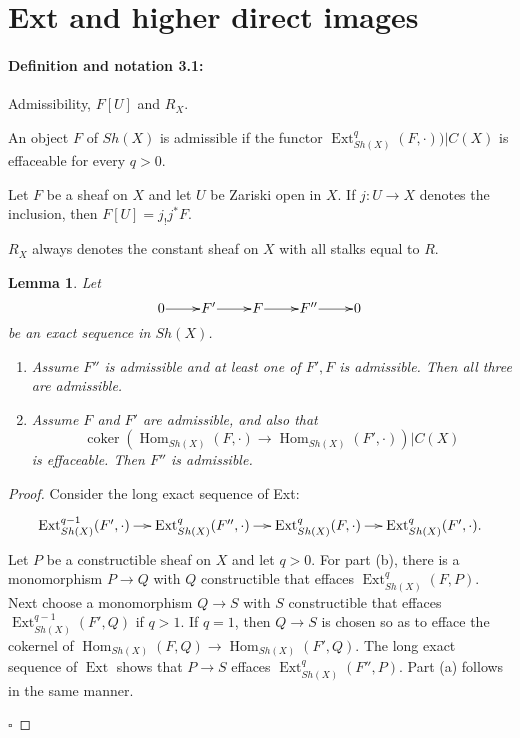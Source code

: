 \documentclass[10pt,twoside]{article}
\newtheorem{lem}[thm]{Lemma}
\newcommand{\Hom}{{\operatorname{Hom}}}
\newcommand{\Ext}{{\operatorname{Ext}}}
\newcommand{\coker}{\operatorname{coker}}
\newcommand{\qed}{\nopagebreak\par\hspace*{\fill}$\square$\par\vskip2mm}
\newtheorem{proof}{Proof}
\begin{document}
\section{Ext and higher direct images}

\paragraph{\textbf{Definition and notation 3.1:}}Admissibility, 
$F[U]$ and $R_X$.

An object $F$ of $Sh(X)$ is admissible if the functor $\Ext^q_{Sh(X)}(F,\cdot))
|C(X)$ is effaceable for every $q>0$.

Let $F$ be a sheaf on $X$ and let $U$ be Zariski open in $X$.
If $j:U \to X$ denotes the inclusion, then $F[U]=j_!j^*F$. 
 
$R_X$ always denotes the constant sheaf on $X$ with all stalks 
equal to $R$. 


\renewcommand{\thethm}{3.2}

\begin{lem} Let 
$$
\xymatrix@1{
0\ar[r] & F'\ar[r] & F \ar[r] & F'' \ar[r] & 0
}
$$ 
be an exact sequence in $Sh(X)$. 
\begin{enumerate}
\item[{\rm (a)}] Assume $F''$ is admissible
and at least one of  {$F', F$} is admissible. Then all three are
admissible. 
\item[{\rm (b)}] Assume $F$ and $F'$ are admissible, and also 
that  
$$
\coker ( \Hom_{Sh(X)}(F,\cdot) \to \Hom_{Sh(X)}(F',\cdot))|C(X) 
$$ 
is effaceable. Then  $F''$ is admissible.
\end{enumerate}
\end{lem}

\begin{proof} Consider the long exact sequence of Ext:
$$
\xymatrix@-1pc{
\Ext^{q-1}_{Sh(X)}(F',\cdot) \ar[r] &
\Ext^q_{Sh(X)}(F'',\cdot) \ar[r] &  \Ext^q_{Sh(X)}(F,\cdot)    
\ar[r] & \Ext^q_{Sh(X)}(F',\cdot). 
}
$$
Let $P$ be a constructible sheaf on $X$ and let $q>0$. For
part (b), there is a monomorphism $P \to Q$ with $Q$ constructible
that effaces $\Ext^q_{Sh(X)}(F,P)$. Next choose a monomorphism
$Q \to S$ with $S$ constructible 
that effaces $\Ext^{q-1}_{Sh(X)}(F',Q)$ if $q>1$. If $q=1$,
then $Q \to S$ is chosen so as to efface the
cokernel of $ \Hom_{Sh(X)}(F,Q)    
\to \Hom_{Sh(X)}(F',Q) $. The long exact sequence
of $\Ext$ shows that $P \to S$ effaces $\Ext^q_{Sh(X)}(F'',P)$.
 Part (a) follows in the same manner. 
\qed\end{proof}
\end{document}
